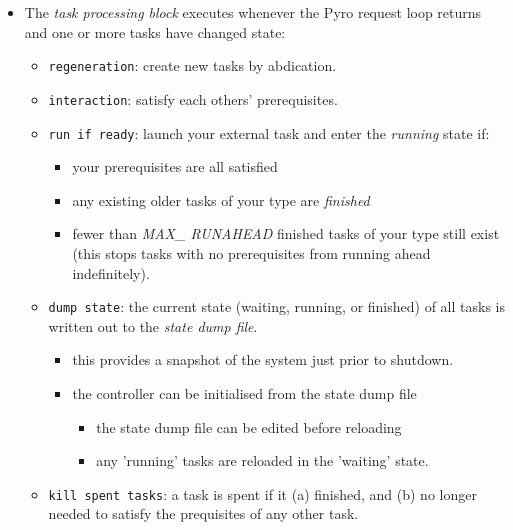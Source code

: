 \documentclass[12pt]{article}
\begin{document}
\begin{itemize}
\item The {\em task processing block} executes whenever the Pyro request
loop returns and one or more tasks have changed state: 

    \begin{itemize} 
    \item \verb#regeneration#: create new tasks by abdication.

    \item \verb#interaction#: satisfy each others' prerequisites. 

    \item \verb#run if ready#: launch your external task and enter the
    {\em running} state if:
        \begin{itemize}
        \item your prerequisites are all satisfied
        \item any existing older tasks of your type are {\em finished} 
        \item fewer than {\em MAX\_ RUNAHEAD} finished tasks of your
        type still exist (this stops tasks with no prerequisites from
        running ahead indefinitely).
        \end{itemize}

    \item \verb#dump state#: the current state (waiting, running, or
    finished) of all tasks is written out to the {\em state dump file}.
        \begin{itemize}
        \item this provides a snapshot of the system just prior to shutdown.

        \item the controller can be initialised from the state dump file
            \begin{itemize}
            \item the state dump file can be edited before reloading

            \item any 'running' tasks are reloaded in the 'waiting' state.
            \end{itemize}
        \end{itemize}

    \item \verb#kill spent tasks#: a task is spent if it (a) finished,
    and (b) no longer needed to satisfy the prequisites of any other
    task.
       \begin{itemize}


\end{itemize}
\end{itemize}
\end{itemize}
\end{document}
